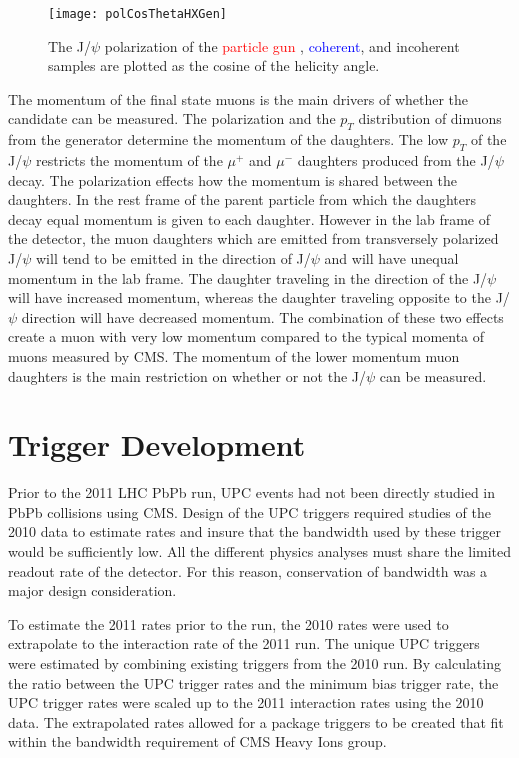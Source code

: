     \begin{figure}[!Hhbt]
      \centering
      \texttt{[image: polCosThetaHXGen]}
      \caption{ The J/$\psi$ polarization of the \textcolor{red}{particle gun}
        , \textcolor{blue}{coherent}, and incoherent samples are plotted as the
        cosine of the helicity angle.} 
      \label{fig:genHXAngle}
    \end{figure}

    The momentum of the final state muons is the main drivers of whether the 
      candidate can be measured. 
    The polarization and the $p_{T}$ distribution of dimuons from the generator
      determine the momentum of the daughters. 
    The low $p_{T}$ of the J/$\psi$ restricts the momentum of the $\mu^{+}$ and
      $\mu^{-}$ daughters produced from the J/$\psi$ decay. 
    The polarization effects how the momentum is shared between the daughters.
    In the rest frame of the parent particle from which the daughters decay
      equal momentum is given to each daughter. 
    However in the lab frame of the detector, the muon daughters which are 
      emitted from transversely polarized J/$\psi$ will tend to be emitted in
      the direction of J/$\psi$ and will have unequal momentum in the lab 
      frame.
    The daughter traveling in the direction of the J/$\psi$ will have increased
      momentum, whereas the daughter traveling opposite to the J/$\psi$ 
      direction will have decreased momentum. 
    The combination of these two effects create a muon with very low momentum 
      compared to the typical momenta of muons measured by CMS. 
    The momentum of the lower momentum muon daughters is the main restriction
      on whether or not the J/$\psi$ can be measured. 

  \section{\label{sec:TrigDev} Trigger Development} 
    Prior to the 2011 LHC PbPb run, UPC events had not been directly studied in 
      PbPb collisions using CMS. 
    Design of the UPC triggers required studies of the 2010 data to estimate 
      rates and insure that the bandwidth used by these trigger would be
      sufficiently low. 
    All the different physics analyses must share the limited readout rate of 
      the detector.
    For this reason, conservation of bandwidth was a major design consideration.

    To estimate the 2011 rates prior to the run, the 2010 rates were used to 
      extrapolate to the interaction rate of the 2011 run. 
    The unique UPC triggers were estimated by combining existing triggers from
      the 2010 run. 
    By calculating the ratio between the UPC trigger rates and the minimum bias
      trigger rate, the UPC trigger rates were scaled up to the 2011 
      interaction rates using the 2010 data. 
    The extrapolated rates allowed for a package triggers to be created that 
      fit within the bandwidth requirement of CMS Heavy Ions group. 

